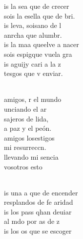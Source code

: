 \documentclass[12pt]{article}
\begin{document}
\begin{multicols*}{2}
\begin{cancion}[Id y enseñad][Garabaín]%
	is la sea que de crecer\\
	sois la esella que de bri.\\
	is leva, soisano de l\\
	anrcha que  alumbr.\\
\jump
	is la maa queelve a nacer\\
	sois espigque vuela gra\\
	is aguijy cari a la z\\
	tesgos que v enviar.\\\jump\\
	\begin{chorus}%
	amigos, r el mundo\\
	unciando el ar\\
	sajeros de lida,\\
	a paz y el peón.\\
	amigos losestigos\\
	 mi resurreccn. \\
	llevando mi sencia\\
	vosotros esto\\
	\end{chorus}%
	\jump\\
	is una a que de encender\\
	resplandos de fe aridad\\
	is los pass qhan deuiar\\
	al mdo por as de z\\
\jump
	is los os que se escoger\\

\end{cancion}
\end{multicols*}
\end{document}
